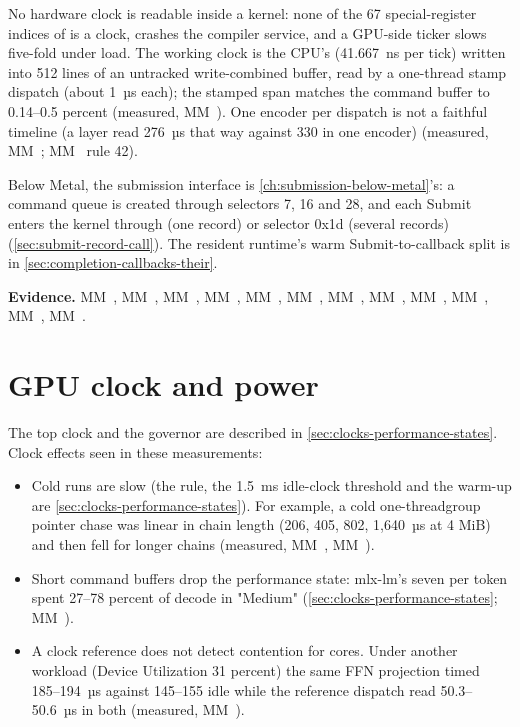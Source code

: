 No hardware clock is readable inside a kernel: none of the 67 special-register indices of
 is a clock,  crashes the compiler service, and a GPU-side
ticker slows five-fold under load. The working clock is the CPU's  (41.667~ns per tick) written
into 512 lines of an untracked write-combined buffer, read by a one-thread stamp dispatch (about 1~µs each); the
stamped span matches the command buffer to 0.14–0.5 percent (measured, MM~). One encoder per dispatch is not
a faithful timeline (a layer read 276~µs that way against 330 in one encoder) (measured, MM~; MM~ rule 42).

Below Metal, the submission interface is \cref{ch:submission-below-metal}'s: a command queue is
created through selectors 7, 16 and 28, and each Submit enters the kernel through  (one record) or
 selector 0x1d (several records) (\cref{sec:submit-record-call}). The resident runtime's warm Submit-to-callback
split is in \cref{sec:completion-callbacks-their}.

\textbf{Evidence.} MM~, MM~, MM~, MM~, MM~, MM~, MM~, MM~,
MM~, MM~, MM~, MM~.

\section{GPU clock and power}\label{sec:clocks-power-gpu}

The top clock and the governor are described in \cref{sec:clocks-performance-states}. Clock effects seen in these measurements:

\begin{itemize}
\item Cold runs are slow (the rule, the 1.5~ms idle-clock threshold and the warm-up are \cref{sec:clocks-performance-states}). For example,
  a cold one-threadgroup pointer chase was linear in chain length (206, 405, 802, 1,640~µs at 4 MiB) and
  then fell for longer chains (measured, MM~, MM~).
\item Short command buffers drop the performance state: mlx-lm's seven per token spent 27–78 percent of decode in
  "Medium" (\cref{sec:clocks-performance-states}; MM~).
\item A clock reference does not detect contention for cores. Under another workload (Device Utilization 31 percent) the same FFN
  projection timed 185–194~µs against 145–155 idle while the reference dispatch read 50.3–50.6~µs in both (measured,
  MM~).
\end{itemize}

